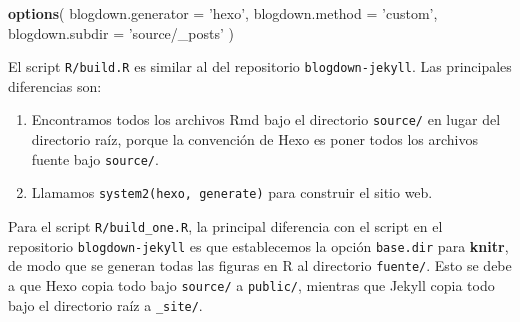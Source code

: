 \documentclass[12pt,]{krantz}
\makeatletter
\newenvironment{Shaded}{\begin{snugshade}}{\end{snugshade}}
\newcommand{\DataTypeTok}[1]{\textcolor[rgb]{0.13,0.29,0.53}{#1}}
\newcommand{\KeywordTok}[1]{\textcolor[rgb]{0.13,0.29,0.53}{\textbf{#1}}}
\newcommand{\NormalTok}[1]{#1}
\newcommand{\StringTok}[1]{\textcolor[rgb]{0.31,0.60,0.02}{#1}}
\newenvironment{kframe}{%
\medskip{}
\setlength{\fboxsep}{.8em}
 \def\at@end@of@kframe{}%
 \ifinner\ifhmode%
  \def\at@end@of@kframe{\end{minipage}}%
  \begin{minipage}{\columnwidth}%
 \fi\fi%
 \def\FrameCommand##1{\hskip\@totalleftmargin \hskip-\fboxsep
 \colorbox{shadecolor}{##1}\hskip-\fboxsep
     \hskip-\linewidth \hskip-\@totalleftmargin \hskip\columnwidth}%
 \MakeFramed {\advance\hsize-\width
   \@totalleftmargin\z@ \linewidth\hsize
   \@setminipage}}%
 {\par\unskip\endMakeFramed%
 \at@end@of@kframe}
\renewenvironment{Shaded}{\begin{kframe}}{\end{kframe}}
\theoremstyle{definition}
\theoremstyle{definition}
\theoremstyle{definition}
\theoremstyle{remark}
\makeatother
\begin{document}
\begin{Shaded}
\begin{Highlighting}[]
\KeywordTok{options}\NormalTok{(}
  \DataTypeTok{blogdown.generator =} \StringTok{'hexo'}\NormalTok{,}
  \DataTypeTok{blogdown.method =} \StringTok{'custom'}\NormalTok{,}
  \DataTypeTok{blogdown.subdir =} \StringTok{'source/_posts'}
\NormalTok{)}
\end{Highlighting}
\end{Shaded}

El script \texttt{R/build.R} es similar al del repositorio
\texttt{blogdown-jekyll}. Las principales diferencias son:

\begin{enumerate}
\def\labelenumi{\arabic{enumi}.}
\item
  Encontramos todos los archivos Rmd bajo el directorio \texttt{source/}
  en lugar del directorio raíz, porque la convención de Hexo es poner
  todos los archivos fuente bajo \texttt{source/}.
\item
  Llamamos
  \texttt{system2(\textquotesingle{}hexo\textquotesingle{},\ \textquotesingle{}generate\textquotesingle{})}
  para construir el sitio web.
\end{enumerate}

Para el script \texttt{R/build\_one.R}, la principal diferencia con el
script en el repositorio \texttt{blogdown-jekyll} es que establecemos la
opción \texttt{base.dir} para \textbf{knitr}, de modo que se generan
todas las figuras en R al directorio \texttt{fuente/}. Esto se debe a
que Hexo copia todo bajo \texttt{source/} a \texttt{public/}, mientras
que Jekyll copia todo bajo el directorio raíz a \texttt{\_site/}.
\end{document}
